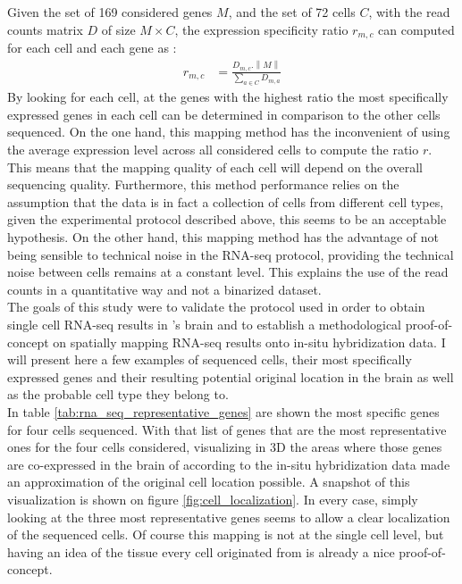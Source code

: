 	Given the set of 169 considered genes $M$, and the set of 72 cells $C$, with the read counts matrix $D$ of size $M\times C$, the expression specificity ratio $r_{m,c}$ can computed for each cell and each gene as :
\begin{eqnarray*}
	r_{m,c} &= \frac{D_{m,c}.\left\|M\right\|}{\sum_{a \in C}D_{m,a}}
\end{eqnarray*}
By looking for each cell, at the genes with the highest ratio the most specifically expressed genes in each cell can be determined in comparison to the other cells sequenced. On the one hand, this mapping method has the inconvenient of using the average expression level across all considered cells to compute the ratio $r$. This means that the mapping quality of each cell will depend on the overall sequencing quality. Furthermore, this method performance relies on the assumption that the data is in fact a collection of cells from different cell types, given the experimental protocol described above, this seems to be an acceptable hypothesis. On the other hand, this mapping method has the advantage of not being sensible to technical noise in the RNA-seq protocol, providing the technical noise between cells remains at a constant level. This explains the use of the read counts in a quantitative way and not a binarized dataset.\\

	The goals of this study were to validate the protocol used in order to obtain single cell RNA-seq results in \platy{}'s brain and to establish a methodological proof-of-concept on spatially mapping RNA-seq results onto in-situ hybridization data. I will present here a few examples of sequenced cells, their most specifically expressed genes and their resulting potential original location in the brain as well as the probable cell type they belong to.\\
	
	In table \ref{tab:rna_seq_representative_genes} are shown the most specific genes for four cells sequenced. With that list of genes that are the most representative ones for the four cells considered, visualizing in 3D the areas where those genes are co-expressed in the brain of \platy{} according to the in-situ hybridization data made an approximation of the original cell location possible. A snapshot of this visualization is shown on figure \ref{fig:cell_localization}. In every case, simply looking at the three most representative genes seems to allow a clear localization of the sequenced cells. Of course this mapping is not at the single cell level, but having an idea of the tissue every cell originated from is already a nice proof-of-concept.\\
	
